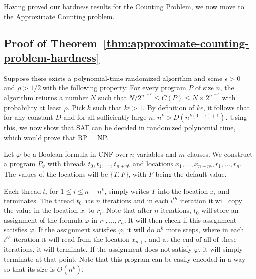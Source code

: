 \documentclass[acmsmall]{acmart}
\newcommand{\sharpP}{\#\mathsf{P}}
\begin{document}

Having proved our hardness results for the Counting Problem, we now move to the Approximate Counting problem.

\subsection{Proof of Theorem~\ref{thm:approximate-counting-problem-hardness}} \label{theory:B}

Suppose there exists a polynomial-time randomized algorithm and some $\epsilon > 0$
and $\rho > 1/2$
with the following property: For every program $P$ of size $n$,
the algorithm returns a number $N$ such that $N/2^{n^{1-\epsilon}} \le C(P) \le N \times 2^{n^{1-\epsilon}}$ with probability at least $\rho$. Pick $k$ such that $k\epsilon > 1$. By definition of $k\epsilon$, it follows that for any constant $D$ and for all sufficiently large $n$,
$n^k > D(n^{k(1-\epsilon)+1})$. Using this, we now show that SAT can be decided in randomized polynomial time, which would prove that RP = NP. 

Let $\varphi$ be a Boolean formula in CNF over $n$ variables and $m$ clauses.
We construct a program $P_\varphi$ with threads $t_0,t_1,\dots,t_{n+n^k}$ and locations $x_1,\dots,x_{n+n^k}, r_1,\dots,r_n$. 
The values of the locations
will be $\{T,F\}$, with $F$ being the default value. 

Each thread $t_i$ for $1 \le i \le n+n^k$, simply writes $T$ into the location $x_i$
and terminates. The thread $t_0$ has $n$ iterations and in each $i^{th}$ iteration
it will copy the value in the location $x_i$ to $r_i$. Note that
after $n$ iterations, $t_0$ will store an assignment of the formula $\varphi$
in $r_1,\dots,r_n$. It will then check if this assignment satisfies $\varphi$.
If the assignment satisfies $\varphi$, it will do $n^k$ more steps, where in each $i^{th}$ iteration it will read from the location $x_{n+i}$ and at the end of all of 
these iterations, it will terminate.
If the assignment does not satisfy $\varphi$, it will simply terminate at that point.
Note that this program can be easily encoded in a way so that its size is $O(n^k)$.
\end{document}
